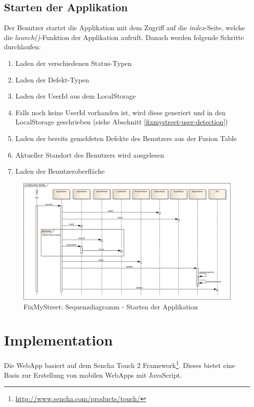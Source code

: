 \subsection{Starten der Applikation}
Der Benutzer startet die Applikation mit dem Zugriff auf die \emph{index}-Seite, welche die \emph{launch()}-Funktion der Applikation aufruft. Danach werden folgende Schritte durchlaufen:

\begin{enumerate}
\item Laden der verschiedenen Status-Typen
\item Laden der Defekt-Typen
\item Laden der UserId aus dem LocalStorage
\item Falls noch keine UserId vorhanden ist, wird diese generiert und in den LocalStorage geschrieben (siehe Abschnitt \ref{fixmystreet-user-detection})
\item Laden der bereits gemeldeten Defekte des Benutzers aus der Fusion Table
\item Aktueller Standort des Benutzers wird ausgelesen
\item Laden der Benutzeroberfläche
\end{enumerate}

\begin{figure}[H]
	\centering
	\includegraphics[width=\textwidth]{images/usecase2-fixmystreet/uml/fixmystreet-sequencediagram-applicationstartup}
	\caption{FixMyStreet: Sequenzdiagramm - Starten der Applikation}
	\label{fixmystreet-sequencediagram-applicationstartup}
\end{figure}

\section{Implementation}
Die WebApp basiert auf dem Sencha Touch 2 Framework\footnote{\url{http://www.sencha.com/products/touch/}}. Dieses bietet eine Basis zur Erstellung von mobilen WebApps mit JavaScript.

